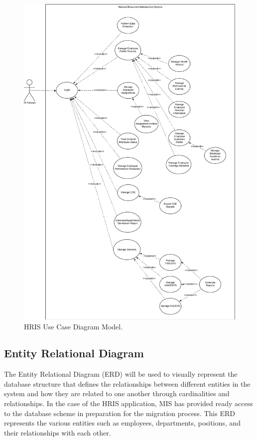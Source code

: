     \begin{figure}[H]
        \centering
        \includegraphics[width=0.9\linewidth]{figures/images/use-case.png}
        \caption{HRIS Use Case Diagram Model.}
        \label{fig:use-case}
    \end{figure}
    
    \subsection{Entity Relational Diagram}
    
    The Entity Relational Diagram (ERD) will be used to visually represent the database structure that defines the relationships between different entities in the system and how they are related to one another through cardinalities and relationships. In the case of the HRIS application, MIS has provided ready access to the database scheme in preparation for the migration process. This ERD represents the various entities such as employees, departments, positions, and their relationships with each other. 
    
